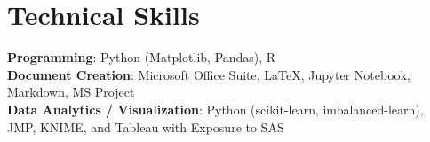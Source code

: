 \documentclass[letterpaper,12pt]{article} %
\begin{document}
\begin{comment}
This section is compressed from the various skills sections that Euro CV
recommends.
\end{comment}

\section{Technical Skills}
 \begin{itemize}[leftmargin=0.5cm, label={}]
    \small{\item{
     \textbf{Programming}{: Python (Matplotlib, Pandas), R} \\
     \smallskip
     \textbf{Document Creation}{: Microsoft Office Suite, \LaTeX, Jupyter Notebook, Markdown, MS Project} \\
     \smallskip
     \textbf{Data Analytics / Visualization}{: Python (scikit-learn, imbalanced-learn), JMP, KNIME, and Tableau with Exposure to SAS} \\
    }}
 \end{itemize}
    
\end{document}
